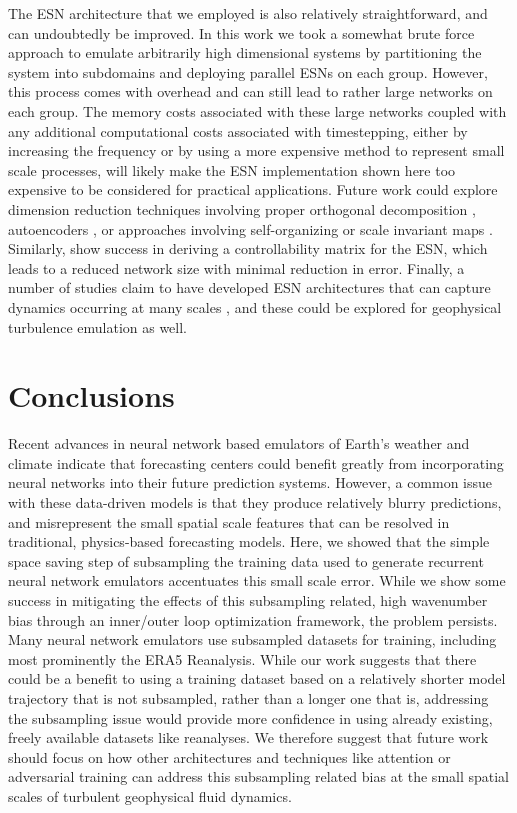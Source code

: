 \documentclass[draft]{agujournal2019}
\newcommand{\citep}{\cite}
\newcommand{\citet}{\citeA}
\begin{document}
The ESN architecture that we employed is also relatively straightforward, and
can undoubtedly be improved.
In this work we took a somewhat brute force approach to emulate arbitrarily
high dimensional systems by partitioning the system into subdomains and
deploying parallel ESNs on each group.
However, this process comes with overhead and can still lead to rather large
networks on each group.
The memory costs associated with these large networks coupled with any
additional computational costs associated with timestepping, either by
increasing the frequency or by using a more expensive method to represent small
scale processes, will likely make the ESN implementation shown here too
expensive to be considered for practical applications.
Future work could explore dimension reduction techniques involving
proper orthogonal decomposition \citep{jordanou_investigation_2022},
autoencoders \citep{heyder_generalizability_2022},
or approaches involving self-organizing or scale invariant maps
\citep{basterrech_self-organizing_2011}.
Similarly, \citet{whiteaker_reducing_2022}
show success in deriving a controllability matrix for the
ESN, which leads to a reduced network size with minimal reduction in
error.
Finally, a number of studies claim to have developed ESN architectures that
can capture dynamics occurring at many scales
\citep{moon_hierarchical_2021,ma_deepr-esn_2020,gallicchio_design_2018,gallicchio_deep_2017,malik_multilayered_2017},
and these could be
explored for geophysical turbulence emulation as well.


\section{Conclusions}
\label{sec:conclusions}

Recent advances in neural network based emulators of Earth's weather and climate
indicate that forecasting centers could benefit greatly from incorporating
neural networks into their future prediction systems.
However, a common issue with these data-driven models is that they produce
relatively blurry predictions, and misrepresent the small spatial scale features
that can be resolved in traditional, physics-based forecasting models.
Here, we showed that the simple space saving step of subsampling the training
data used to generate recurrent neural network emulators accentuates this
small scale error.
While we show some success in mitigating the effects of this subsampling
related, high wavenumber bias through an inner/outer loop optimization
framework, the problem persists.
Many neural network emulators use subsampled datasets for training, including
most prominently the ERA5 Reanalysis.
While our work suggests that there could be a benefit to using a training
dataset based on a relatively
shorter model trajectory that is not subsampled, rather than a longer one that
is, addressing the subsampling issue would provide more confidence in using
already existing, freely available datasets like reanalyses.
We therefore suggest that future work should focus on how other architectures
and techniques like
attention or adversarial training can address this subsampling related bias at
the small spatial scales of turbulent geophysical fluid dynamics.
\end{document}

